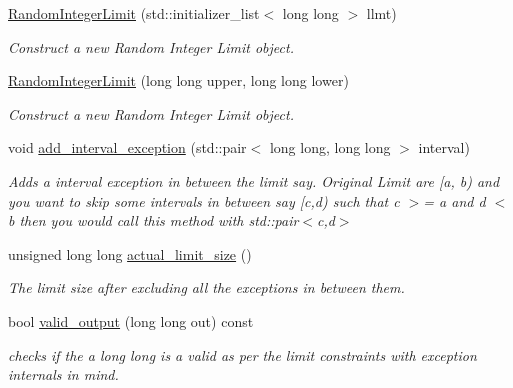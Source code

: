 \begin{DoxyCompactItemize}
\item 
\hyperlink{classtestcaser_1_1maker_1_1RandomIntegerLimit_ae70b7c715a632c4a079a0c37452decbf}{Random\+Integer\+Limit} (std\+::initializer\+\_\+list$<$ long long $>$ llmt)
\begin{DoxyCompactList}\small\item\em Construct a new Random Integer Limit object. \end{DoxyCompactList}\item 
\hyperlink{classtestcaser_1_1maker_1_1RandomIntegerLimit_a43781197d959fc8ab6cf54258df35a64}{Random\+Integer\+Limit} (long long upper, long long lower)
\begin{DoxyCompactList}\small\item\em Construct a new Random Integer Limit object. \end{DoxyCompactList}\item 
void \hyperlink{classtestcaser_1_1maker_1_1RandomIntegerLimit_aab21ea4c9643021d1993da96408a9d6d}{add\+\_\+interval\+\_\+exception} (std\+::pair$<$ long long, long long $>$ interval)
\begin{DoxyCompactList}\small\item\em Adds a interval exception in between the limit say. Original Limit are \mbox{[}a, b) and you want to skip some intervals in between say \mbox{[}c,d) such that c $>$= a and d $<$ b then you would call this method with std\+::pair$<$c,d$>$ \end{DoxyCompactList}\item 
unsigned long long \hyperlink{classtestcaser_1_1maker_1_1RandomIntegerLimit_a657f8d368dbfe2e9269d1d499a728954}{actual\+\_\+limit\+\_\+size} ()
\begin{DoxyCompactList}\small\item\em The limit size after excluding all the exceptions in between them. \end{DoxyCompactList}\item 
bool \hyperlink{classtestcaser_1_1maker_1_1RandomIntegerLimit_a3015e3b8e3c490e9acad46faf8c2bc96}{valid\+\_\+output} (long long out) const
\begin{DoxyCompactList}\small\item\em checks if the a long long is a valid as per the limit constraints with exception internals in mind. \end{DoxyCompactList}\end{DoxyCompactItemize}
